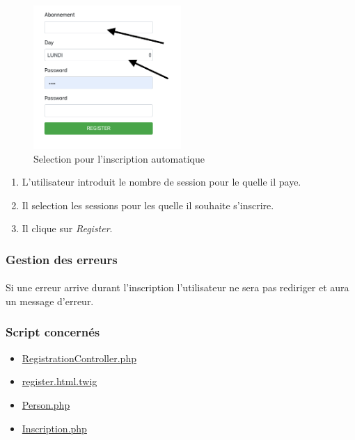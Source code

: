 \begin{figure}[h]
	\includegraphics[width=0.5\textwidth,center]{Figures/us4-1}
	\caption{Selection pour l'inscription automatique}
\end{figure}

\begin{enumerate}
	\item L'utilisateur introduit le nombre de session pour le quelle il paye.
	\item Il selection les sessions pour les quelle il souhaite s'inscrire.
	\item Il clique sur \textit{Register}.
\end{enumerate}

\subsubsection{Gestion des erreurs}
	\paragraph{}
		Si une erreur arrive durant l'inscription l'utilisateur ne sera pas rediriger et aura un message d'erreur. 
	
	
\newpage
\subsubsection{Script concernés}
	\begin{itemize}
		\item \href{https://github.com/victorsmits/Aquabike/blob/master/backend/src/Controller/RegistrationController.php}{RegistrationController.php}
		\item \href{https://github.com/victorsmits/Aquabike/blob/master/backend/templates/registration/register.html.twig}{register.html.twig}
		\item \href{https://github.com/victorsmits/Aquabike/blob/master/backend/src/Entity/Person.php}{Person.php}
		\item \href{https://github.com/victorsmits/Aquabike/blob/master/backend/src/Entity/Inscription.php}{Inscription.php}
	\end{itemize}
